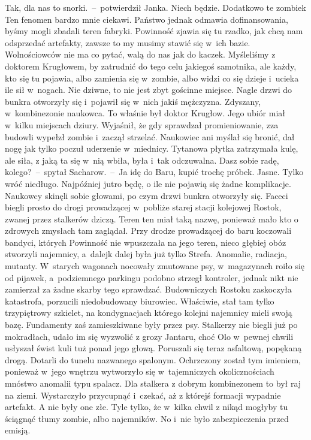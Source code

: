 \documentclass[../MAIN.tex]{subfiles}
\begin{document}
\xx Tak, dla nas to snorki.~--~potwierdził Janka.
\xx Niech będzie. Dodatkowo te zombie\3k Ten fenomen bardzo mnie ciekawi. Państwo jednak odmawia dofinansowania, byśmy mogli zbadali teren fabryki. Powinność zjawia się tu rzadko, jak chcą nam odsprzedać artefakty, zawsze to my musimy stawić się w~ich bazie. Wolnościowców nie ma co pytać, walą do nas jak do kaczek. Myśleliśmy z doktorem Krugłowem, by zatrudnić do tego celu jakiegoś samotnika, ale każdy, kto się tu pojawia, albo zamienia się w~zombie, albo widzi co się dzieje i~ucieka ile sił w~nogach.
\xx Nie dziwne, to nie jest zbyt gościnne miejsce.
\qm
Nagle drzwi do bunkra otworzyły się i~pojawił się w~nich jakiś mężczyzna. Zdyszany, w~kombinezonie naukowca. To właśnie był doktor Krugłow. Jego ubiór miał w~kilku miejscach dziury. Wyjaśnił, że gdy sprawdzał promieniowanie, zza budowli wypełzł zombie i~zaczął strzelać. Naukowiec ani myślał się bronić, dał nogę jak tylko poczuł uderzenie w~miednicy. Tytanowa płytka zatrzymała kulę, ale siła, z jaką ta się w~nią wbiła, była i~tak odczuwalna.
\sx Dasz sobie radę, kolego?~--~spytał Sacharow.~--~Ja idę do Baru, kupić trochę próbek.
\xx Jasne. Tylko wróć niedługo.
\xx Najpóźniej jutro będę, o ile nie pojawią się żadne komplikacje.
\qm
Naukowcy skinęli sobie głowami, po czym drzwi bunkra otworzyły się. Faceci biegli prosto do drogi prowadzącej w~pobliże starej stacji kolejowej Rostok, zwanej przez stalkerów dziczą. Teren ten miał taką nazwę, ponieważ mało kto o zdrowych zmysłach tam zaglądał. Przy drodze prowadzącej do baru koczowali bandyci, których Powinność nie wpuszczała na jego teren, nieco głębiej obóz stworzyli najemnicy, a~dalej\3k dalej była już tylko Strefa. Anomalie, radiacja, mutanty. W~starych wagonach nocowały zmutowane psy, w~magazynach roiło się od pijawek, a~podziemnego parkingu podobno strzegł kontroler, jednak nikt nie zamierzał za żadne skarby tego sprawdzać. Budowniczych Rostoku zaskoczyła katastrofa, porzucili niedobudowany biurowiec. Właściwie, stał tam tylko trzypiętrowy szkielet, na kondygnacjach którego kolejni najemnicy mieli swoją bazę. Fundamenty zaś zamieszkiwane były przez psy.
Stalkerzy nie biegli już po mokradłach, udało im się wyzwolić z grozy Jantaru, choć Olo w~pewnej chwili usłyszał świst kuli tuż ponad jego głową. Poruszali się teraz asfaltową, popękaną drogą. Dotarli do tunelu nazwanego spalonym. Ochrzczony został tym imieniem, ponieważ w~jego wnętrzu wytworzyło się w~tajemniczych okolicznościach mnóstwo anomalii typu spalacz. Dla stalkera z dobrym kombinezonem to był raj na ziemi. Wystarczyło przycupnąć i~czekać, aż z którejś formacji wypadnie artefakt. A nie były one złe. Tyle tylko, że w~kilka chwil z nikąd mogłyby tu ściągnąć tłumy zombie, albo najemników. No i~nie było zabezpieczenia przed emisją.
\end{document}
